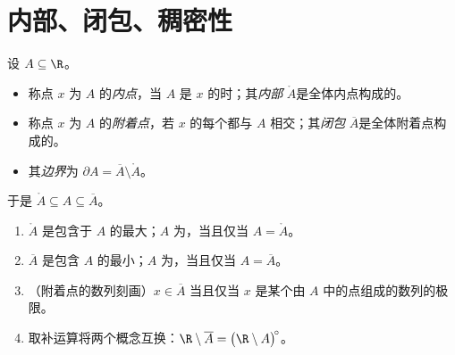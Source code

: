 \section{内部、闭包、稠密性}

\begin{definition}[内部、闭包、边界]\label{def:b1:topology:closure}
设 $A \subseteq \R$。
\begin{itemize}
  \item 称点 $x$ 为 $A$ 的\emph{内点}，当 $A$ 是
        $x$ 的时；其\emph{内部}
        $\mathring{A}$是全体内点构成的。
  \item 称点 $x$ 为 $A$ 的\emph{附着点}，若
        $x$ 的每个都与 $A$ 相交；其\emph{闭包}
        $\overline{A}$是全体附着点构成的。
  \item 其\emph{边界}为 $\partial A = \overline A \setminus
        \mathring A$。
\end{itemize}
于是 $\mathring A \subseteq A \subseteq \overline A$。
\end{definition}

\begin{proposition}[主要性质]\label{prop:b1:topology:closureprops}
\begin{enumerate}
  \item $\mathring A$ 是包含于 $A$ 的最大；$A$
        为，当且仅当 $A = \mathring A$。
  \item $\overline A$ 是包含 $A$ 的最小；$A$
        为，当且仅当 $A = \overline A$。
  \item （附着点的数列刻画）$x \in \overline
        A$ 当且仅当 $x$ 是某个由
        $A$ 中的点组成的数列的极限。
  \item 取补运算将两个概念互换：$\R \setminus
        \overline A = \bigl(\R \setminus A\bigr)^{\!\circ}$。
\end{enumerate}
\end{proposition}

